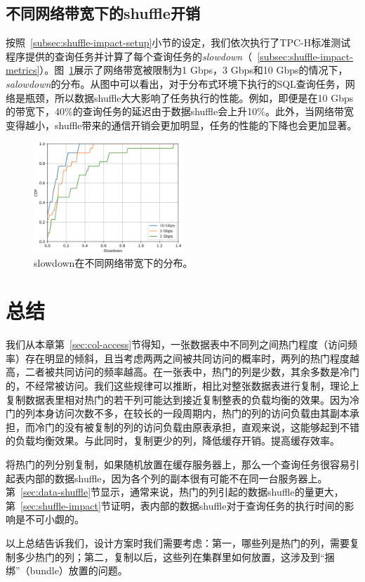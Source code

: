 \subsection{不同网络带宽下的shuffle开销}

\par 按照~\ref{subsec:shuffle-impact-setup}小节的设定，我们依次执行了TPC-H标准测试程序提供的查询任务并计算了每个查询任务的\emph{slowdown}（~\ref{subsec:shuffle-impact-metrics}）。图~\ref{fig:cdf16-all}展示了网络带宽被限制为1 Gbps，3 Gbps和10 Gbps的情况下，\emph{salowdown}的分布。从图中可以看出，对于分布式环境下执行的SQL查询任务，网络是瓶颈，所以数据shuffle大大影响了任务执行的性能。例如，即便是在10 Gbps的带宽下，40\%的查询任务的延迟由于数据shuffle会上升10\%。此外，当网络带宽变得越小，shuffle带来的通信开销会更加明显，任务的性能的下降也会更加显著。



\begin{figure}[]
	\centering
	\includegraphics[width=0.5\textwidth]{img/motivation/cdf16-all}
	
	\caption{slowdown在不同网络带宽下的分布。}
	\label{fig:cdf16-all}
\end{figure}

\section{总结}

\par 我们从本章第~\ref{sec:col-access}节得知，一张数据表中不同列之间热门程度（访问频率）存在明显的倾斜，且当考虑两两之间被共同访问的概率时，两列的热门程度越高，二者被共同访问的频率越高。在一张表中，热门的列是少数，其余多数是冷门的，不经常被访问。我们这些规律可以推断，相比对整张数据表进行复制，理论上复制数据表里相对热门的若干列可能达到接近复制整表的负载均衡的效果。因为冷门的列本身访问次数不多，在较长的一段周期内，热门的列的访问负载由其副本承担，而冷门的没有被复制的列的访问负载由原表承担，直观来说，这能够起到不错的负载均衡效果。与此同时，复制更少的列，降低缓存开销。提高缓存效率。

\par 将热门的列分别复制，如果随机放置在缓存服务器上，那么一个查询任务很容易引起表内部的数据shuffle，因为各个列的副本很有可能不在同一台服务器上。第~\ref{sec:data-shuffle}节显示，通常来说，热门的列引起的数据shuffle的量更大，第~\ref{sec:shuffle-impact}节证明，表内部的数据shuffle对于查询任务的执行时间的影响是不可小觑的。

\par 以上总结告诉我们，设计方案时我们需要考虑：第一，哪些列是热门的列，需要复制多少热门的列；第二，复制以后，这些列在集群里如何放置，这涉及到“捆绑”（bundle）放置的问题。